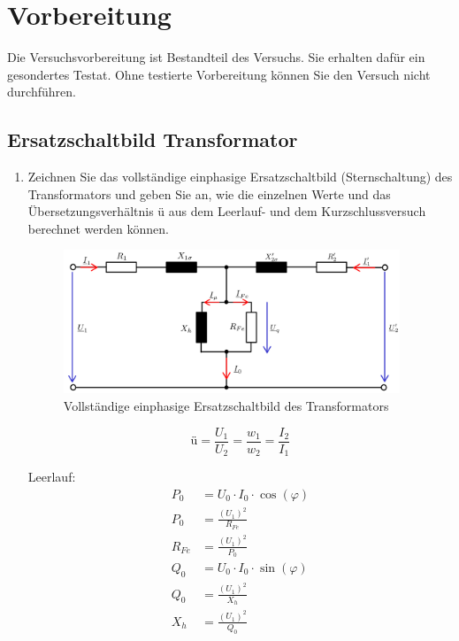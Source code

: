 \section{Vorbereitung}
 {Die Versuchsvorbereitung ist Bestandteil des Versuchs. Sie erhalten dafür ein gesondertes Testat.
  Ohne testierte Vorbereitung können Sie den Versuch nicht durchführen.}
\subsection{Ersatzschaltbild Transformator}
\begin{enumerate}[label=\alph*)]
	\item Zeichnen Sie das vollständige einphasige Ersatzschaltbild (Sternschaltung) des
	      Transformators und geben Sie an, wie die einzelnen Werte und das
	      Übersetzungsverhältnis ü aus dem Leerlauf- und dem Kurzschlussversuch berechnet
	      werden können.
	      \begin{figure}[h!]
		      \begin{center}
			      \includegraphics[width=0.95\textwidth]{img/2.1.1.1}
		      \end{center}
		      \caption{Vollständige einphasige Ersatzschaltbild des Transformators}\label{img:2.1.1.11}
	      \end{figure}
	      $$ü=\frac{U_1}{U_2}=\frac{w_1}{w_2}=\frac{I_2}{I_1}$$
	      \begin{minipage}{0.5\textwidth}
		      Leerlauf:
		      \begin{align*}
			      P_0    & = U_0 \cdot I_0 \cdot \cos(\varphi) \\
			      P_0    & = \frac{(U_1)^2}{R_{Fe}}            \\
			      R_{Fe} & = \frac{(U_1)^2}{P_0}               \\
			      Q_0    & = U_0 \cdot I_0 \cdot \sin(\varphi) \\
			      Q_0    & = \frac{(U_1)^2}{X_{h}}             \\
			      X_h    & = \frac{(U_1)^2}{Q_0}               \\

\end{align*}
\end{minipage}
\end{enumerate}

